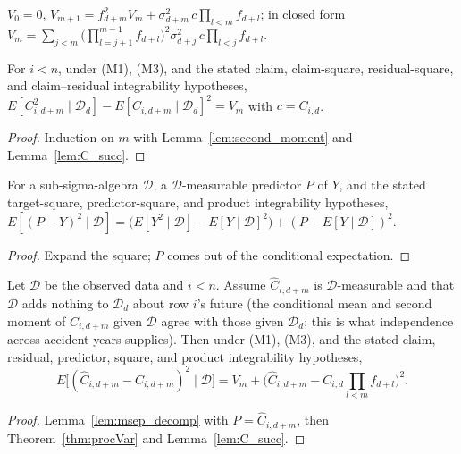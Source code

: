 \begin{definition}\label{def:procVar}\leanok
$V_0 = 0$, $V_{m+1} = f_{d+m}^2 V_m + \sigma_{d+m}^2\, c\prod_{l<m} f_{d+l}$; in closed form
$V_m = \sum_{j<m}\big(\prod_{l=j+1}^{m-1} f_{d+l}\big)^2 \sigma_{d+j}^2\, c \prod_{l<j} f_{d+l}$.
\end{definition}

\begin{theorem}\label{thm:procVar}\leanok
{}
For $i<n$, under (M1), (M3), and the stated claim, claim-square, residual-square,
and claim--residual integrability hypotheses,
$E[C_{i,d+m}^2 \mid \mathcal{D}_d] - E[C_{i,d+m} \mid \mathcal{D}_d]^2 = V_m$
with $c = C_{i,d}$.
\end{theorem}
\begin{proof}\leanok Induction on $m$ with Lemma~\ref{lem:second_moment} and Lemma~\ref{lem:C_succ}. \end{proof}

\begin{lemma}\label{lem:msep_decomp}\leanok
For a sub-sigma-algebra $\mathcal D$, a $\mathcal{D}$-measurable predictor $P$ of $Y$,
and the stated target-square, predictor-square, and product integrability hypotheses,
$E[(P - Y)^2 \mid \mathcal{D}] = \big(E[Y^2 \mid \mathcal{D}] - E[Y \mid \mathcal{D}]^2\big) + (P - E[Y \mid \mathcal{D}])^2$.
\end{lemma}
\begin{proof}\leanok Expand the square; $P$ comes out of the conditional expectation. \end{proof}

\begin{theorem}\label{thm:msep}\leanok
{}
Let $\mathcal{D}$ be the observed data and $i<n$. Assume $\hat C_{i,d+m}$ is $\mathcal{D}$-measurable and
that $\mathcal{D}$ adds nothing to $\mathcal{D}_d$ about row $i$'s future (the conditional mean and
second moment of $C_{i,d+m}$ given $\mathcal{D}$ agree with those given $\mathcal{D}_d$; this is
what independence across accident years supplies). Then under (M1), (M3), and the stated
claim, residual, predictor, square, and product integrability hypotheses,
\[
E\big[(\hat C_{i,d+m} - C_{i,d+m})^2 \mid \mathcal{D}\big] = V_m + \big(\hat C_{i,d+m} - C_{i,d}\textstyle\prod_{l<m} f_{d+l}\big)^2 .
\]
\end{theorem}
\begin{proof}\leanok Lemma~\ref{lem:msep_decomp} with $P = \hat C_{i,d+m}$, then Theorem~\ref{thm:procVar} and Lemma~\ref{lem:C_succ}. \end{proof}

